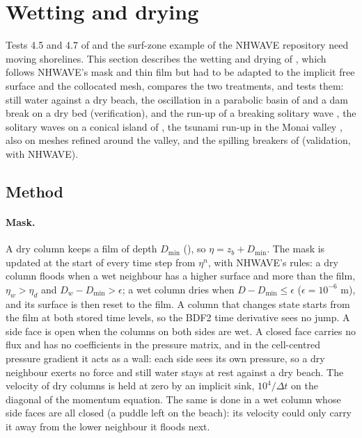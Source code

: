 \section{Wetting and drying}
\label{sec:wd}

Tests 4.5 and 4.7 of \citet{ma2012} and the surf-zone example of the NHWAVE
repository need moving shorelines. This section describes the wetting and
drying of \NHFOAM, which follows NHWAVE's mask and thin film
\citep[][Section~3.4]{ma2012} but had to be adapted to the implicit free
surface and the collocated mesh, compares the two treatments, and tests them:
still water against a dry beach, the oscillation in a parabolic basin of
\citet{thacker1981} and a dam break on a dry bed (verification), and the
run-up of a breaking solitary wave \citep{synolakis1987}, the solitary waves
on a conical island of \citet{briggs1995}, the tsunami run-up in the Monai
valley \citep{matsuyama2001}, also on meshes refined around the valley, and
the spilling breakers of \citet{ting1994} (validation, with NHWAVE).

\subsection{Method}
\label{sec:wd-method}

\paragraph{Mask.} A dry column keeps a film of depth $D_{\min}$
(), so $\eta = z_b + D_{\min}$. The mask is updated at the start
of every time step from $\eta^n$, with NHWAVE's rules: a dry column floods when
a wet neighbour has a higher surface and more than the film,
$\eta_w > \eta_d$ and $D_w - D_{\min} > \epsilon$; a wet column dries when
$D - D_{\min} \le \epsilon$ ($\epsilon = 10^{-6}$ m), and its surface is then
reset to the film. A column that changes state starts from the film at both
stored time levels, so the BDF2 time derivative sees no jump. A side face is
open when the columns on both sides are wet. A closed face carries no flux and
has no coefficients in the pressure matrix, and in the cell-centred pressure
gradient it acts as a wall: each side sees its own pressure, so a dry
neighbour exerts no force and still water stays at rest against a dry beach.
The velocity of dry columns is held at zero by an implicit sink,
$10^4/\Delta t$ on the diagonal of the momentum equation. The same is done in
a wet column whose side faces are all closed (a puddle left on the beach): its
velocity could only carry it away from the lower neighbour it floods next.

